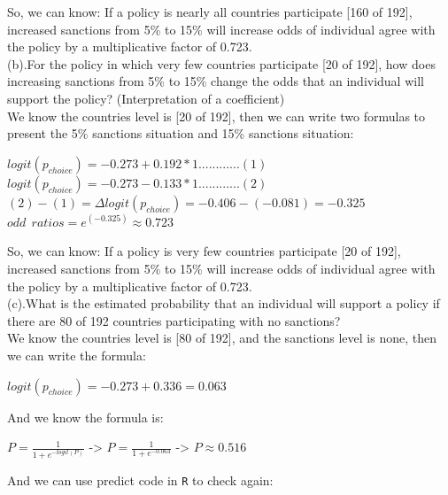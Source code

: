 \documentclass{article} %
\begin{document}
\noindent So, we can know: If a policy is nearly all countries participate [160 of 192], increased sanctions from 5\% to 15\% will increase odds of individual agree with the policy by a multiplicative factor of 0.723. \\

\noindent (b).For the policy in which very few countries participate [20 of 192], how does increasing sanctions from 5\% to 15\% change the odds that an individual will support the policy? (Interpretation of a coefficient)\\

\noindent We know the countries level is [20 of 192], then we can write two formulas to present the 5\% sanctions situation and 15\% sanctions situation: \\
\begin{center}
	$logit(p_{choice}) = -0.273 + 0.192 * 1 ............ (1) $\\ 
	$logit(p_{choice}) = -0.273 - 0.133 * 1 ............  (2) $ \\ 
	$(2) - (1) = \Delta logit(p_{choice}) = -0.406 - (- 0.081) = -0.325$\\
	$odd\ \ ratios =  e ^ {(-0.325)} \approx 0.723 $
\end{center}

\noindent So, we can know: If a policy is very few countries participate [20 of 192], increased sanctions from 5\% to 15\% will increase odds of individual agree with the policy by a multiplicative factor of 0.723. \\

\noindent (c).What is the estimated probability that an individual will support a policy if there are 80 of 192 countries participating with no sanctions? \\

\noindent We know the countries level is [80 of 192], and the sanctions level is none, then we can write the formula: \\
\begin{center}
	$logit(p_{choice}) = -0.273 + 0.336 = 0.063$\\ 
\end{center}
\noindent And we know the formula is: 
\begin{center}
	$ P = \frac{1} { 1 + e^{-logit(P)}}$ ->
	$ P = \frac{1} { 1 + e^{-0.063}}$ ->
	$P \approx 0.516 $\\
\end{center}

\noindent And we can use predict code in \texttt{R} to check again:
 
\end{document}
